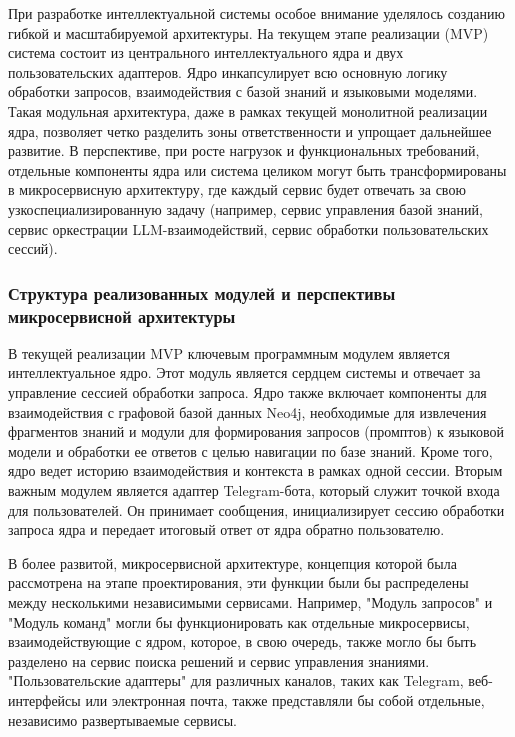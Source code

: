 При разработке интеллектуальной системы особое внимание уделялось созданию гибкой и масштабируемой архитектуры. На текущем этапе реализации (MVP) система состоит из центрального интеллектуального ядра и двух пользовательских адаптеров. Ядро инкапсулирует всю основную логику обработки запросов, взаимодействия с базой знаний и языковыми моделями. Такая модульная архитектура, даже в рамках текущей монолитной реализации ядра, позволяет четко разделить зоны ответственности и упрощает дальнейшее развитие. В перспективе, при росте нагрузок и функциональных требований, отдельные компоненты ядра или система целиком могут быть трансформированы в микросервисную архитектуру, где каждый сервис будет отвечать за свою узкоспециализированную задачу (например, сервис управления базой знаний, сервис оркестрации LLM-взаимодействий, сервис обработки пользовательских сессий).

\subsubsection{Структура реализованных модулей и перспективы микросервисной архитектуры}

В текущей реализации MVP ключевым программным модулем является интеллектуальное ядро. Этот модуль является сердцем системы и отвечает за управление сессией обработки запроса. Ядро также включает компоненты для взаимодействия с графовой базой данных Neo4j, необходимые для извлечения фрагментов знаний и модули для формирования запросов (промптов) к языковой модели и обработки ее ответов с целью навигации по базе знаний. Кроме того, ядро ведет историю взаимодействия и контекста в рамках одной сессии. Вторым важным модулем является адаптер Telegram-бота, который служит точкой входа для пользователей. Он принимает сообщения, инициализирует сессию обработки запроса ядра и передает итоговый ответ от ядра обратно пользователю.

В более развитой, микросервисной архитектуре, концепция которой была рассмотрена на этапе проектирования, эти функции были бы распределены между несколькими независимыми сервисами. Например, "Модуль запросов" и "Модуль команд" могли бы функционировать как отдельные микросервисы, взаимодействующие с ядром, которое, в свою очередь, также могло бы быть разделено на сервис поиска решений и сервис управления знаниями. "Пользовательские адаптеры" для различных каналов, таких как Telegram, веб-интерфейсы или электронная почта, также представляли бы собой отдельные, независимо развертываемые сервисы.

